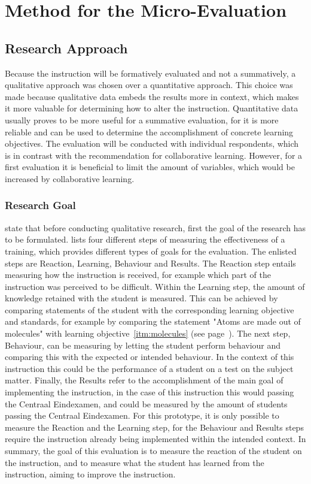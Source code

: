 \documentclass[11pt,twoside]{report} %
\begin{document}
\chapter{Method for the Micro-Evaluation}
\label{ch:methodevaluation}

\section{Research Approach}

Because the instruction will be formatively evaluated and not a summatively, a qualitative approach was chosen over a quantitative approach. This choice was made because qualitative data embeds the results more in context, which makes it more valuable for determining how to alter the instruction. Quantitative data usually proves to be more useful for a summative evaluation, for it is more reliable and can be used to determine the accomplishment of concrete learning objectives. The evaluation will be conducted with individual respondents, which is in contrast with the recommendation for collaborative learning. However, for a first evaluation it is beneficial to limit the amount of variables, which would be increased by collaborative learning.

\subsection{Research Goal}

 state that before conducting qualitative research, first the goal of the research has to be formulated.  lists four different steps of measuring the effectiveness of a training, which provides different types of goals for the evaluation. The enlisted steps are Reaction, Learning, Behaviour and Results. The Reaction step entails measuring how the instruction is received, for example which part of the instruction was perceived to be difficult. Within the Learning step, the amount of knowledge retained with the student is measured. This can be achieved by comparing statements of the student with the corresponding learning objective and standards, for example by comparing the statement "Atoms are made out of molecules" with learning objective~\ref{itm:molecules} (see page~\pageref{itm:molecules}). The next step, Behaviour, can be measuring by letting the student perform behaviour and comparing this with the expected or intended behaviour. In the context of this instruction this could be the performance of a student on a test on the subject matter. Finally, the Results refer to the accomplishment of the main goal of implementing the instruction, in the case of this instruction this would passing the Centraal Eindexamen, and could be measured by the amount of students passing the Centraal Eindexamen. For this prototype, it is only possible to measure the Reaction and the Learning step, for the Behaviour and Results steps require the instruction already being implemented within the intended context. In summary, the goal of this evaluation is to measure the reaction of the student on the instruction, and to measure what the student has learned from the instruction, aiming to improve the instruction.
\end{document}
